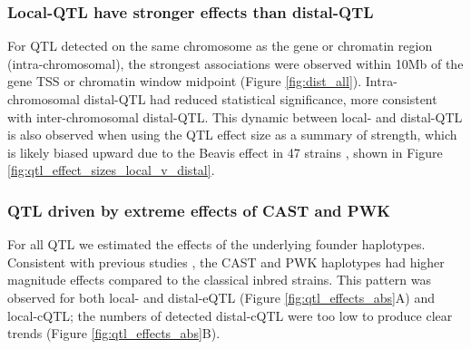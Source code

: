 \documentclass[9pt,twocolumn,twoside]{gsajnl}
\newcommand{\WV}[2]{\textcolor{red}{#1\footnote{\textcolor{red}{WV: #2}}}}
\newcommand{\GKinline}[1]{\textcolor{teal}{#1}}
\begin{document}
\subsubsection{Local-QTL have stronger effects than distal-QTL}
For QTL detected on the same chromosome as the gene or chromatin region (intra-chromosomal), the strongest associations were observed within 10Mb of the gene TSS or chromatin window midpoint (Figure \ref{fig:dist_all}). Intra-chromosomal distal-QTL had reduced statistical significance, more consistent with inter-chromosomal distal-QTL. This dynamic between local- and distal-QTL is also observed when using the QTL effect size as a summary of strength, which is likely biased upward due to the Beavis effect in 47 strains \citep{Keele2019}, shown in Figure \ref{fig:qtl_effect_sizes_local_v_distal}.




\subsubsection{QTL driven by extreme effects of CAST and PWK}
For all QTL we estimated the effects of the underlying founder haplotypes. Consistent with previous studies \citep{Aylor2011}, the CAST and PWK haplotypes had higher magnitude effects compared to the classical inbred strains. This pattern was observed for both local- and distal-eQTL (Figure \ref{fig:qtl_effects_abs}A) and local-cQTL; the numbers of detected distal-cQTL were too low to produce clear trends (Figure \ref{fig:qtl_effects_abs}B).
\end{document}
